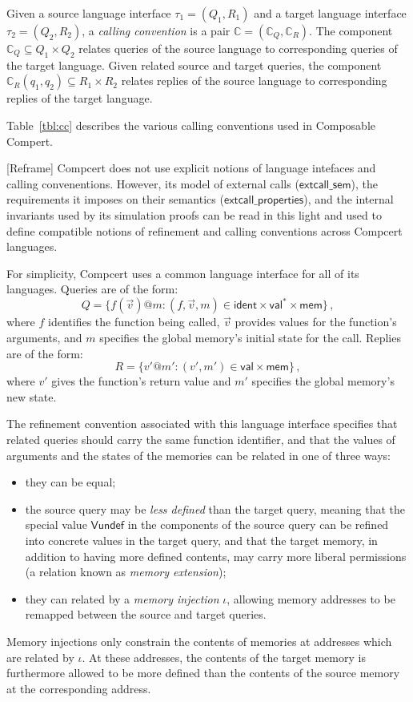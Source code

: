 \documentclass[sigplan,10pt,review,anonymous]{acmart}
\newcommand{\kw}[1]{\ensuremath{ \textsf{#1} }}
\begin{document}
\begin{definition}
Given a source language interface $\tau_1 = (Q_1, R_1)$ and
a target language interface $\tau_2 = (Q_2, R_2)$,
a \emph{calling convention} is a pair
$\mathbb{C} = (\mathbb{C}_Q, \mathbb{C}_R)$.
The component
$\mathbb{C}_Q \subseteq Q_1 \times Q_2$
relates queries of the source language to
corresponding queries of the target language.
Given related source and target queries,
the component
$\mathbb{C}_R(q_1, q_2) \subseteq R_1 \times R_2$
relates replies of the source language to
corresponding replies of the target language.
\end{definition}

Table~\ref{tbl:cc} describes the various calling conventions
used in Composable Compert.

[Reframe] Compcert does not use explicit notions of
language intefaces and calling convenentions.
However,
its model of external calls
(\kw{extcall\_sem}),
the requirements it imposes on their semantics
(\kw{extcall\_properties}),
and the internal invariants used by its simulation proofs
can be read in this light
and used to define
compatible notions of refinement and calling conventions
across Compcert languages.

For simplicity,
Compcert uses a common language interface
for all of its languages.
Queries are of the form:
\[
  Q = \{ f(\vec{v})@m : (f, \vec{v}, m) \in
    \kw{ident} \times \kw{val}^* \times \kw{mem} \} \,,
\]
where $f$ identifies the function being called,
$\vec{v}$ provides values for the function's arguments, and
$m$ specifies the global memory's initial state for the call.
Replies are of the form:
\[
  R = \{ v'@m' : (v', m') \in
    \kw{val} \times \kw{mem} \} \,,
\]
where $v'$ gives the function's return value and
$m'$ specifies the global memory's new state.

The refinement convention associated with this language interface
specifies that
related queries should carry the same function identifier,
and that the values of arguments and the states of the memories
can be related in one of three ways:
\begin{itemize}
\item they can be equal;
\item the source query may be
  \emph{less defined} than the target query,
  meaning that the special value $\kw{Vundef}$
  in the components of the source query
  can be refined into concrete values in the target query,
  and that the target memory,
  in addition to having more defined contents,
  may carry more liberal permissions
  (a relation known as \emph{memory extension});
\item they can related by a \emph{memory injection} $\iota$,
  allowing memory addresses to be remapped
  between the source and target queries.
\end{itemize}
Memory injections only constrain the contents of memories
at addresses which are related by $\iota$.
At these addresses,
the contents of the target memory is furthermore
allowed to be more defined than the contents of the source
memory at the corresponding address.
\end{document}
